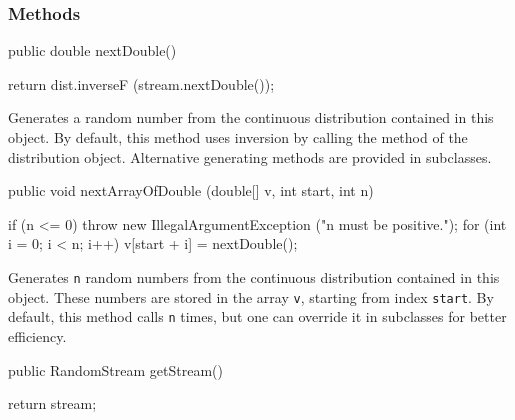\subsubsection* {Methods}
\begin{code}

   public double nextDouble() \begin{hide} {
      return dist.inverseF (stream.nextDouble());
   }\end{hide}
\end{code}
  \begin{tabb} Generates a random number from the continuous distribution
    contained in this object.
    By default, this method uses inversion by calling the
    method of the distribution object.
    Alternative generating methods are provided in subclasses.
 \end{tabb}
\begin{htmlonly}
\end{htmlonly}
\begin{code}

   public void nextArrayOfDouble (double[] v, int start, int n) \begin{hide} {
      if (n <= 0)
         throw new IllegalArgumentException ("n must be positive.");
      for (int i = 0; i < n; i++)
         v[start + i] = nextDouble();
   }\end{hide}
\end{code}
\begin{tabb}
   Generates \texttt{n} random numbers from the continuous distribution
   contained in this object.  These numbers are stored in the array \texttt{v},
   starting from index \texttt{start}.
   By default, this method calls  \texttt{n}
   times, but one can override it in subclasses for better efficiency.
 \end{tabb}
\begin{htmlonly}
\end{htmlonly}
\begin{code}

   public RandomStream getStream() \begin{hide} { return stream; }
\end{hide}
\end{code}
